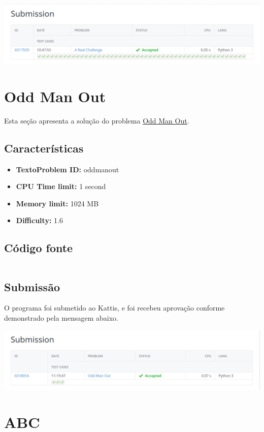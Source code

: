 \documentclass[11pt,a4paper]{scrreprt}
\begin{document}
\includegraphics[scale=0.47]{img/ARealChallenge.png}

\section{Odd Man Out}

Esta seção apresenta a solução do problema \href{https://open.kattis.com/problems/oddmanout}{Odd Man Out}.

\subsection{Características}

\begin{itemize}
    \item\textbf{TextoProblem ID: } oddmanout
    \item\textbf{CPU Time limit: } 1 second
    \item\textbf{Memory limit: } 1024 MB
    \item\textbf{Difficulty: }  1.6
\end{itemize}

\subsection{Código fonte}

\inputminted[linenos]{python}{src/OddManOut.py}

\subsection{Submissão}
O programa foi submetido ao Kattis, e foi recebeu aprovação conforme demonstrado pela mensagem abaixo.

\includegraphics[scale=0.47]{img/OddManOut.png}

\section{ABC}
\end{document}
